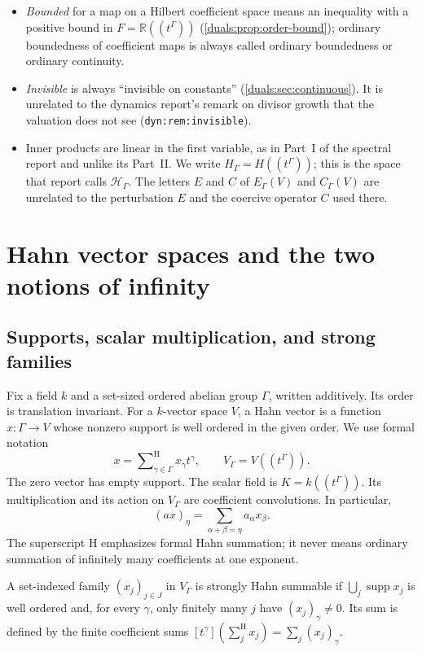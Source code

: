 \documentclass[11pt,letterpaper]{article}
\numberwithin{equation}{section}
\theoremstyle{definition}
\theoremstyle{remark}
\newcommand{\R}{\mathbb R}
\newcommand{\Z}{\mathbb Z}
\newcommand{\supp}{\operatorname{supp}}
\newcommand{\sH}{\mathop{\sum}\nolimits^{\mathrm H}}
\newcommand{\lab}[1]{\texttt{#1}}
\begin{document}
\begin{itemize}
 $\Gamma$ is not ordered isomorphic to $\Z$. For a nonzero ordered group
 this is the same as not being cyclic.
\item \emph{Bounded} for a map on a Hilbert coefficient space means an
 inequality with a positive bound in $F=\R((t^\Gamma))$
 (\cref{duals:prop:order-bound}); ordinary boundedness of coefficient maps
 is always called ordinary boundedness or ordinary continuity.
\item \emph{Invisible} is always ``invisible on constants''
 (\cref{duals:sec:continuous}). It is unrelated to the dynamics report's
 remark on divisor growth that the valuation does not see
 (\lab{dyn:rem:invisible}).
\item Inner products are linear in the first variable, as in Part~I of the
 spectral report and unlike its Part~II. We write
 $H_\Gamma=H((t^\Gamma))$; this is the space that report calls
 $\mathcal H_\Gamma$. The letters $E$ and $C$ of $E_\Gamma(V)$ and
 $C_\Gamma(V)$ are unrelated to the perturbation $E$ and the coercive
 operator $C$ used there.
\end{itemize}

\section{Hahn vector spaces and the two notions of infinity}\label{duals:sec:setup}

\subsection{Supports, scalar multiplication, and strong families}
Fix a field $k$ and a set-sized ordered abelian group $\Gamma$, written
additively. Its order is translation invariant. For a $k$-vector space
$V$, a Hahn vector is a function $x:\Gamma\to V$ whose nonzero support
is well ordered in the given order. We use formal notation
\[
 x=\sH_{\gamma\in\Gamma}x_\gamma t^\gamma,
 \qquad V_\Gamma=V((t^\Gamma)).
\]
The zero vector has empty support. The scalar field is
$K=k((t^\Gamma))$. Its multiplication and its action on $V_\Gamma$
are coefficient convolutions. In particular,
\[
 (a x)_\eta=\sum_{\alpha+\beta=\eta}a_\alpha x_\beta.
\]
The superscript H emphasizes formal Hahn summation; it never means
ordinary summation of infinitely many coefficients at one exponent.

\begin{definition}\label{duals:def:strong-family}
A set-indexed family $(x_j)_{j\in J}$ in $V_\Gamma$ is strongly
Hahn summable if $\bigcup_j\supp x_j$ is well ordered and, for every
$\gamma$, only finitely many $j$ have $(x_j)_\gamma\ne0$.
Its sum is defined by the finite coefficient sums
$[t^\gamma](\sH_j x_j)=\sum_j(x_j)_\gamma$.
\end{definition}
\end{document}
